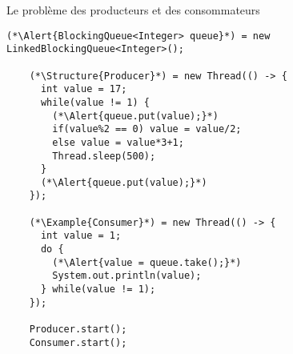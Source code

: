 
\begingroup

\begin{frame}[fragile]{Le problème des producteurs et des consommateurs}

  \begin{lstlisting}[gobble=4]
    (*\Alert{BlockingQueue<Integer> queue}*) = new LinkedBlockingQueue<Integer>();

    (*\Structure{Producer}*) = new Thread(() -> {
      int value = 17;
      while(value != 1) {
        (*\Alert{queue.put(value);}*)
        if(value%2 == 0) value = value/2;
        else value = value*3+1;
        Thread.sleep(500);
      }
      (*\Alert{queue.put(value);}*)
    });

    (*\Example{Consumer}*) = new Thread(() -> {
      int value = 1;
      do {
        (*\Alert{value = queue.take();}*)
        System.out.println(value);
      } while(value != 1);
    });

    Producer.start();
    Consumer.start();
  \end{lstlisting}


\end{frame}

\endgroup
\endinput

